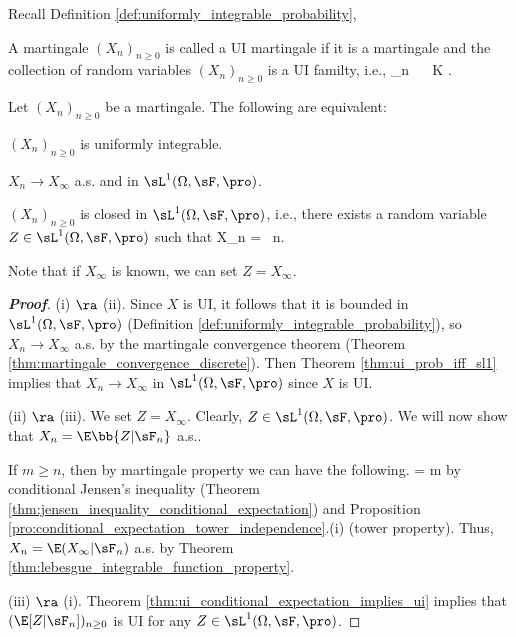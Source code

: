Recall Definition \ref{def:uniformly_integrable_probability},

\begin{definition}\label{def:uniformly_integrable_martingale}
A martingale $(X_n)_{n\geq 0}$ is called a UI martingale if it is a martingale and the collection of random variables $(X_n)_{n\geq 0}$ is a UI familty, i.e.,
\be
\sup_{n} \E{}  \  \ K \to \infty.
\ee
\end{definition}

\begin{theorem}\label{thm:martingale_ui_as_l1_closed_discrete}
Let $(X_n)_{ n \geq 0}$ be a martingale. The following are equivalent:
\ben
\item [(i)] $(X_n)_{n\geq 0}$ is uniformly integrable.
\item [(ii)] $X_n \to  X_\infty$ a.s. and in $\sL^1(\Omega,\sF,\pro)$.
\item [(iii)] $(X_n)_{n\geq 0}$ is closed in $\sL^1(\Omega,\sF,\pro)$, i.e., there exists a random variable $Z\in \sL^1(\Omega ,\sF,\pro)$ such that
\be
X_n = \E{}\ n.
\ee

Note that if $X_\infty$ is known, we can set $Z = X_\infty$.
\een
\end{theorem}

\begin{proof}[\bf Proof]
(i) $\ra$ (ii). Since $X$ is UI, it follows that it is bounded in $\sL^1(\Omega,\sF,\pro)$ (Definition \ref{def:uniformly_integrable_probability}), so $X_n \to  X_\infty$ a.s. by the martingale convergence theorem (Theorem \ref{thm:martingale_convergence_discrete}). Then Theorem \ref{thm:ui_prob_iff_sl1} implies that $X_n \to  X_\infty$ in $\sL^1(\Omega,\sF,\pro)$ since $X$ is UI.

(ii) $\ra$ (iii). We set $Z = X_\infty$. Clearly, $Z\in \sL^1(\Omega ,\sF,\pro)$. We will now show that $X_n = \E\bb{Z|\sF_n}$ a.s..

If $m \geq n$, then by martingale property we can have the following.
\be
\E{} = \E{} \leq \E{}  m\to \infty
\ee
by conditional Jensen's inequality (Theorem \ref{thm:jensen_inequality_conditional_expectation}) and Proposition \ref{pro:conditional_expectation_tower_independence}.(i) (tower property). Thus, $X_n = \E(X_\infty|\sF_n)$ a.s. by Theorem \ref{thm:lebesgue_integrable_function_property}.



(iii) $\ra$ (i). Theorem \ref{thm:ui_conditional_expectation_implies_ui} implies that $(\E[Z|\sF_n])_{ n \geq 0}$ is UI for any $Z \in \sL^1(\Omega,\sF,\pro)$.%
\end{proof}

